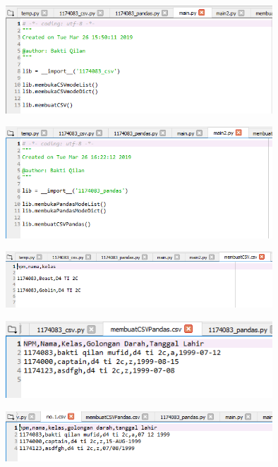 \begin{figure}[H]
	\includegraphics[width=10cm]{figures/4/1174083/Praktek/kode_praktek_3.png}
	\centering
\end{figure}

\begin{figure}[H]
	\includegraphics[width=10cm]{figures/4/1174083/Praktek/kode_praktek_4.png}
	\centering
\end{figure}

\begin{figure}[H]
	\includegraphics[width=10cm]{figures/4/1174083/Praktek/kode_praktek_5.png}
	\centering
\end{figure}

\begin{figure}[H]
	\includegraphics[width=10cm]{figures/4/1174083/Praktek/kode_praktek_6.png}
	\centering
\end{figure}

\begin{figure}[H]
	\includegraphics[width=10cm]{figures/4/1174083/Praktek/kode_praktek_7.png}
	\centering
\end{figure}

